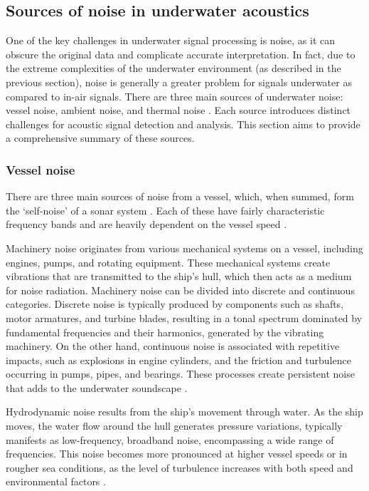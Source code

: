 \subsection{Sources of noise in underwater acoustics}\label{subsec:noise}

One of the key challenges in underwater signal processing is noise, as it can obscure the original data and complicate accurate interpretation. In fact, due to the extreme complexities of the underwater environment (as described in the previous section), noise is generally a greater problem for signals underwater as compared to in-air signals. There are three main sources of underwater noise: vessel noise, ambient noise, and thermal noise \cite{waite_sonar_2002}. Each source introduces distinct challenges for acoustic signal detection and analysis. This section aims to provide a comprehensive summary of these sources.

\subsubsection{Vessel noise}

There are three main sources of noise from a vessel, which, when summed, form the `self-noise' of a sonar system \cite{ross_mechanics_1976}. Each of these have fairly characteristic frequency bands and are heavily dependent on the vessel speed \cite{zak_ships_2008}. 

Machinery noise originates from various mechanical systems on a vessel, including engines, pumps, and rotating equipment. These mechanical systems create vibrations that are transmitted to the ship’s hull, which then acts as a medium for noise radiation. Machinery noise can be divided into discrete and continuous categories. Discrete noise is typically produced by components such as shafts, motor armatures, and turbine blades, resulting in a tonal spectrum dominated by fundamental frequencies and their harmonics, generated by the vibrating machinery. On the other hand, continuous noise is associated with repetitive impacts, such as explosions in engine cylinders, and the friction and turbulence occurring in pumps, pipes, and bearings. These processes create persistent noise that adds to the underwater soundscape \cite{zak_ships_2008, chin-hsing_classification_1998}.

Hydrodynamic noise results from the ship's movement through water. As the ship moves, the water flow around the hull generates pressure variations, typically manifests as low-frequency, broadband noise, encompassing a wide range of frequencies. This noise becomes more pronounced at higher vessel speeds or in rougher sea conditions, as the level of turbulence increases with both speed and environmental factors \cite{bjorno_applied_2017}.

